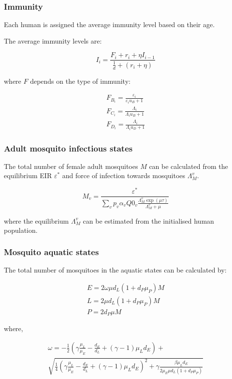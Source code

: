 \documentclass{bmcart}
\begin{document}
\subsubsection*{Immunity}

Each human is assigned the average immunity level based on their age.

The average immunity levels are:

\[ I_i = \frac{F_i + r_i + \eta I_{i-1}}{\frac{1}{d} +(r_i + \eta)} \]

where $F$ depends on the type of immunity:

\begin{gather*}
    F_{B_i} = \frac{\varepsilon_i}{\varepsilon_i u_B + 1} \\
    F_{C_i} = \frac{\Lambda_i}{\Lambda_i u_B + 1} \\
    F_{D_i} = \frac{\Lambda_i}{\Lambda_i u_D + 1}
\end{gather*}

\subsubsection*{Adult mosquito infectious states}

The total number of female adult mosquitoes $M$ can be calculated from the equilibrium EIR $\varepsilon^\ast$ and force of infection towards mosquitoes $\Lambda_M^v$.

\[
M_v = \frac{\varepsilon^\ast}{\sum_v p_v \alpha_v Q0_v \frac{\Lambda_M^v \exp(\mu \tau)}{\Lambda_M^v + \mu}}
\]

where the equilibrium $\Lambda_M^v$ can be estimated from the initialised human population.

\subsubsection*{Mosquito aquatic states}

The total number of mosquitoes in the aquatic states can be calculated by:

\begin{gather*}
    E = 2\omega\mu d_L(1 + d_P\mu_P)M \\
    L = 2\mu d_L(1 + d_P\mu_P)M \\
    P = 2d_P\mu M
\end{gather*}

where,

\begin{multline*}
\omega = - \frac{1}{2}\left(\gamma\frac{\mu_L}{\mu_E} - \frac{d_E}{d_L} + (\gamma - 1) \mu_L d_E\right) + \\
\sqrt{\frac{1}{4}\left(\gamma\frac{\mu_L}{\mu_E} - \frac{d_E}{d_L} + (\gamma - 1) \mu_L d_E\right)^2 + \gamma\frac{\beta\mu_L d_E}{2\mu_E\mu d_L(1 + d_P\mu_P)}}
\end{multline*}
\end{document}
